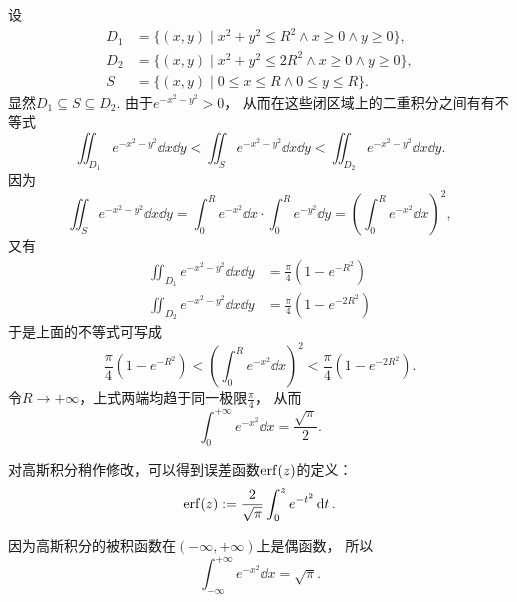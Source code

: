 \begin{example}
\begin{solution}
设\begin{align*}
	D_1 &= \{ (x,y) \mid x^2+y^2 \leq R^2 \land x \geq 0 \land y \geq 0 \}, \\
	D_2 &= \{ (x,y) \mid x^2+y^2 \leq 2 R^2 \land x \geq 0 \land y \geq 0 \}, \\
	S &= \{ (x,y) \mid 0 \leq x \leq R \land 0 \leq y \leq R \}.
\end{align*}
显然\(D_1 \subseteq S \subseteq D_2\).
由于\(e^{-x^2-y^2} > 0\)，
从而在这些闭区域上的二重积分之间有有不等式\begin{equation*}
	\iint_{D_1} e^{-x^2-y^2}\dd{x}\dd{y}
	< \iint_{S} e^{-x^2-y^2}\dd{x}\dd{y}
	< \iint_{D_2} e^{-x^2-y^2}\dd{x}\dd{y}.
\end{equation*}
因为\begin{equation*}
	\iint_{S}{e^{-x^2-y^2}\dd{x}\dd{y}}
	= \int_0^R e^{-x^2}\dd{x} \cdot \int_0^R e^{-y^2} \dd{y}
	= \left( \int_0^R e^{-x^2} \dd{x} \right)^2,
\end{equation*}
又有\begin{align*}
	\iint_{D_1}{e^{-x^2-y^2}\dd{x}\dd{y}}
	&= \frac{\pi}{4} (1 - e^{-R^2}) \\
	\iint_{D_2}{e^{-x^2-y^2}\dd{x}\dd{y}}
	&= \frac{\pi}{4} (1 - e^{-2 R^2})
\end{align*}
于是上面的不等式可写成\begin{equation*}
	\frac{\pi}{4} (1 - e^{-R^2})
	< \left( \int_0^R e^{-x^2} \dd{x} \right)^2
	< \frac{\pi}{4} (1 - e^{-2 R^2}).
\end{equation*}
令\(R \to +\infty\)，上式两端均趋于同一极限\(\frac{\pi}{4}\)，
从而\begin{equation*}
	\int_0^{+\infty} e^{-x^2} \dd{x} = \frac{\sqrt{\pi}}{2}.
\end{equation*}
\end{solution}
\end{example}
\begin{remark}
对高斯积分稍作修改，可以得到误差函数\(\erf(z)\)的定义：
\begin{equation*}
	\erf(z) \defeq \frac{2}{\sqrt{\pi}} \int_0^z e^{-t^2} \dd{t}.
\end{equation*}

因为高斯积分的被积函数在\((-\infty,+\infty)\)上是偶函数，
所以\begin{equation}\label{equation:重积分.常用积分2}
	\int_{-\infty}^{+\infty} e^{-x^2} \dd{x} = \sqrt{\pi}.
\end{equation}
\end{remark}

